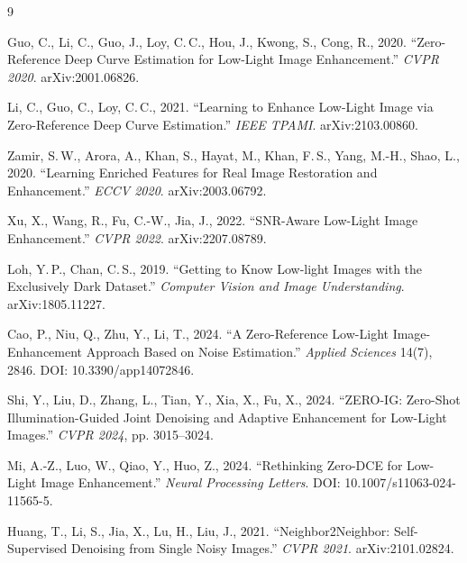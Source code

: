 \documentclass[11pt, letterpaper]{article}
\begin{document}
\begin{thebibliography}{9}

Guo, C., Li, C., Guo, J., Loy, C.\,C., Hou, J., Kwong, S., Cong, R., 2020.
``Zero-Reference Deep Curve Estimation for Low-Light Image Enhancement.''
\textit{CVPR 2020}. arXiv:2001.06826.

Li, C., Guo, C., Loy, C.\,C., 2021.
``Learning to Enhance Low-Light Image via Zero-Reference Deep Curve Estimation.''
\textit{IEEE TPAMI}. arXiv:2103.00860.

Zamir, S.\,W., Arora, A., Khan, S., Hayat, M., Khan, F.\,S., Yang, M.-H., Shao, L., 2020.
``Learning Enriched Features for Real Image Restoration and Enhancement.''
\textit{ECCV 2020}. arXiv:2003.06792.

Xu, X., Wang, R., Fu, C.-W., Jia, J., 2022.
``SNR-Aware Low-Light Image Enhancement.''
\textit{CVPR 2022}. arXiv:2207.08789.

Loh, Y.\,P., Chan, C.\,S., 2019.
``Getting to Know Low-light Images with the Exclusively Dark Dataset.''
\textit{Computer Vision and Image Understanding}. arXiv:1805.11227.

Cao, P., Niu, Q., Zhu, Y., Li, T., 2024.
``A Zero-Reference Low-Light Image-Enhancement Approach Based on Noise Estimation.''
\textit{Applied Sciences} 14(7), 2846. DOI: 10.3390/app14072846.

Shi, Y., Liu, D., Zhang, L., Tian, Y., Xia, X., Fu, X., 2024.
``ZERO-IG: Zero-Shot Illumination-Guided Joint Denoising and Adaptive Enhancement
for Low-Light Images.'' \textit{CVPR 2024}, pp. 3015--3024.

Mi, A.-Z., Luo, W., Qiao, Y., Huo, Z., 2024.
``Rethinking Zero-DCE for Low-Light Image Enhancement.''
\textit{Neural Processing Letters}. DOI: 10.1007/s11063-024-11565-5.

Huang, T., Li, S., Jia, X., Lu, H., Liu, J., 2021.
``Neighbor2Neighbor: Self-Supervised Denoising from Single Noisy Images.''
\textit{CVPR 2021}. arXiv:2101.02824.

\end{thebibliography}
\end{document}
